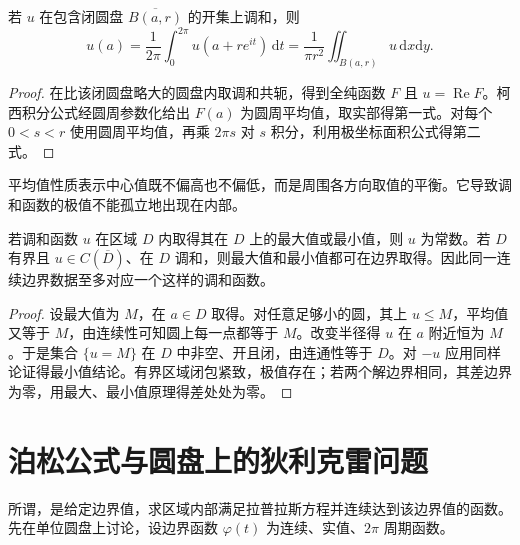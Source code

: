 \documentclass[UTF8,12pt,a4paper,fontset=fandol]{ctexbook}
\begin{document}
\begin{theorem}[平均值性质]
\label{thm:cv-harmonic-mean}
若 $u$ 在包含闭圆盘 $\overline{B(a,r)}$ 的开集上调和，则
\begin{equation}
 u(a)=\frac1{2\pi}\int_0^{2\pi}u(a+re^{it})\,\mathrm dt
 =\frac1{\pi r^2}\iint_{B(a,r)}u\,\mathrm dx\mathrm dy.
 \label{eq:cv-harmonic-mean}
\end{equation}
\end{theorem}
\begin{proof}
在比该闭圆盘略大的圆盘内取调和共轭，得到全纯函数 $F$ 且 $u=\operatorname{Re}F$。柯西积分公式经圆周参数化给出 $F(a)$ 为圆周平均值，取实部得第一式。对每个 $0<s<r$ 使用圆周平均值，再乘 $2\pi s$ 对 $s$ 积分，利用极坐标面积公式得第二式。
\end{proof}

平均值性质表示中心值既不偏高也不偏低，而是周围各方向取值的平衡。它导致调和函数的极值不能孤立地出现在内部。

\begin{theorem}
\label{thm:cv-harmonic-max}
若调和函数 $u$ 在区域 $D$ 内取得其在 $D$ 上的最大值或最小值，则 $u$ 为常数。若 $D$ 有界且 $u\in C(\overline D)$、在 $D$ 调和，则最大值和最小值都可在边界取得。因此同一连续边界数据至多对应一个这样的调和函数。
\end{theorem}
\begin{proof}
设最大值为 $M$，在 $a\in D$ 取得。对任意足够小的圆，其上 $u\le M$，平均值又等于 $M$，由连续性可知圆上每一点都等于 $M$。改变半径得 $u$ 在 $a$ 附近恒为 $M$。于是集合 $\{u=M\}$ 在 $D$ 中非空、开且闭，由连通性等于 $D$。对 $-u$ 应用同样论证得最小值结论。有界区域闭包紧致，极值存在；若两个解边界相同，其差边界为零，用最大、最小值原理得差处处为零。
\end{proof}

\section{泊松公式与圆盘上的狄利克雷问题}

所谓，是给定边界值，求区域内部满足拉普拉斯方程并连续达到该边界值的函数。先在单位圆盘上讨论，设边界函数 $\varphi(t)$ 为连续、实值、$2\pi$ 周期函数。
\end{document}

